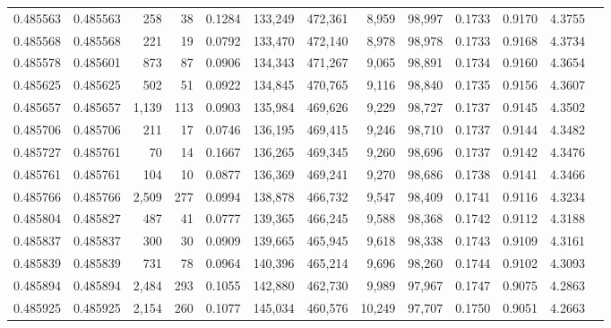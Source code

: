 \begin{tabular}{rrrrrrrrrrrrr}
0.485563 & 0.485563 &   258 &    38 &                                     0.1284 & 133,249 & 472,361 &   8,959 &  98,997 & 0.1733 & 0.9170 & 4.3755 \\
0.485568 & 0.485568 &   221 &    19 &                                     0.0792 & 133,470 & 472,140 &   8,978 &  98,978 & 0.1733 & 0.9168 & 4.3734 \\
0.485578 & 0.485601 &   873 &    87 &                                     0.0906 & 134,343 & 471,267 &   9,065 &  98,891 & 0.1734 & 0.9160 & 4.3654 \\
0.485625 & 0.485625 &   502 &    51 &                                     0.0922 & 134,845 & 470,765 &   9,116 &  98,840 & 0.1735 & 0.9156 & 4.3607 \\
0.485657 & 0.485657 & 1,139 &   113 &                                     0.0903 & 135,984 & 469,626 &   9,229 &  98,727 & 0.1737 & 0.9145 & 4.3502 \\
0.485706 & 0.485706 &   211 &    17 &                                     0.0746 & 136,195 & 469,415 &   9,246 &  98,710 & 0.1737 & 0.9144 & 4.3482 \\
0.485727 & 0.485761 &    70 &    14 &                                     0.1667 & 136,265 & 469,345 &   9,260 &  98,696 & 0.1737 & 0.9142 & 4.3476 \\
0.485761 & 0.485761 &   104 &    10 &                                     0.0877 & 136,369 & 469,241 &   9,270 &  98,686 & 0.1738 & 0.9141 & 4.3466 \\
0.485766 & 0.485766 & 2,509 &   277 &                                     0.0994 & 138,878 & 466,732 &   9,547 &  98,409 & 0.1741 & 0.9116 & 4.3234 \\
0.485804 & 0.485827 &   487 &    41 &                                     0.0777 & 139,365 & 466,245 &   9,588 &  98,368 & 0.1742 & 0.9112 & 4.3188 \\
0.485837 & 0.485837 &   300 &    30 &                                     0.0909 & 139,665 & 465,945 &   9,618 &  98,338 & 0.1743 & 0.9109 & 4.3161 \\
0.485839 & 0.485839 &   731 &    78 &                                     0.0964 & 140,396 & 465,214 &   9,696 &  98,260 & 0.1744 & 0.9102 & 4.3093 \\
0.485894 & 0.485894 & 2,484 &   293 &                                     0.1055 & 142,880 & 462,730 &   9,989 &  97,967 & 0.1747 & 0.9075 & 4.2863 \\
0.485925 & 0.485925 & 2,154 &   260 &                                     0.1077 & 145,034 & 460,576 &  10,249 &  97,707 & 0.1750 & 0.9051 & 4.2663 \\

\end{tabular}
